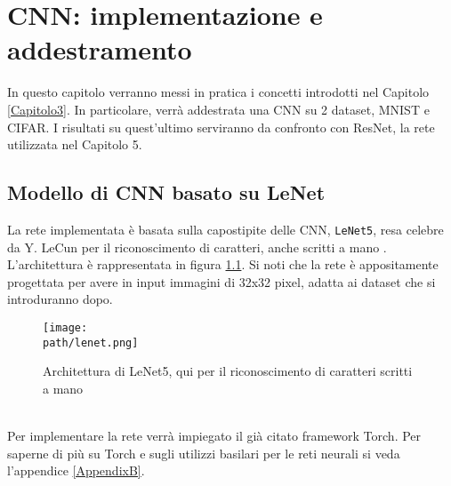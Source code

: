 \chapter{CNN: implementazione e addestramento} %
\label{Capitolo4}
\def \path	{Figures/C4}
In questo capitolo verranno messi in pratica i concetti introdotti nel Capitolo \ref{Capitolo3}. In particolare, verrà addestrata una CNN su 2 dataset, MNIST e CIFAR. I risultati su quest'ultimo serviranno da confronto con ResNet, la rete utilizzata nel Capitolo 5. 
\section{Modello di CNN basato su LeNet}
La rete implementata è basata sulla capostipite delle CNN, \texttt{LeNet5}, resa celebre da Y. LeCun per il riconoscimento di caratteri, anche scritti a mano \parencite{lenet}.  L'architettura è rappresentata in figura \ref{fig:lenet}. Si noti che la rete è appositamente progettata per avere in input immagini di 32x32 pixel, adatta ai dataset che si introduranno dopo. 
\begin{figure}[h!]
 \centering
 \texttt{[image: \\path/lenet.png]} 
 \caption{Architettura di LeNet5, qui per il riconoscimento di caratteri scritti a mano}
 \label{fig:lenet}
\end{figure}	\\
Per implementare la rete verrà impiegato il già citato framework Torch. Per saperne di più su Torch e sugli utilizzi basilari per le reti neurali si veda l'appendice \ref{AppendixB}.

